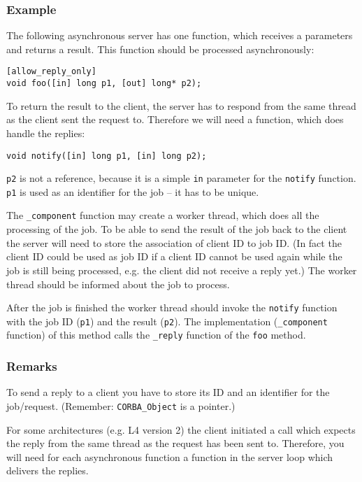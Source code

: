 \subsubsection{Example}
The following asynchronous server has one function, which receives a
parameters and returns a result. This function should be processed
asynchronously:

\begin{verbatim}
[allow_reply_only]
void foo([in] long p1, [out] long* p2);
\end{verbatim}

To return the result to the client, the server has to respond from the same
thread as the client sent the request to. Therefore we will need a
function, which does handle the replies:

\begin{verbatim}
void notify([in] long p1, [in] long p2);
\end{verbatim}

\verb|p2| is not a reference, because it is a simple \verb|in| parameter
for the \verb|notify| function. \verb|p1| is used as an identifier for the
job -- it has to be unique.

The \verb|_component| function may create a worker thread, which does all the
processing of the job. To be able to send the result of the job back to the
client the server will need to store the association of client ID to job ID.
(In fact the client ID could be used as job ID if a client ID cannot be used
again while the job is still being processed, e.g. the client did not receive
a reply yet.) The worker thread should be informed about the job to process. 

After the job is finished the worker thread should invoke the \verb|notify|
function with the job ID (\verb|p1|) and the result (\verb|p2|). The
implementation (\verb|_component| function) of this method calls the
\verb|_reply| function of the \verb|foo| method.

\subsubsection{Remarks}
To send a reply to a client you have to store its ID and an identifier
for the job/request. (Remember: \verb|CORBA_Object| is a pointer.)

For some architectures (e.g. L4 version 2) the client initiated a call which
expects the reply from the same thread as the request has been sent to.
Therefore, you will need for each asynchronous function a function in the
server loop which delivers the replies.

